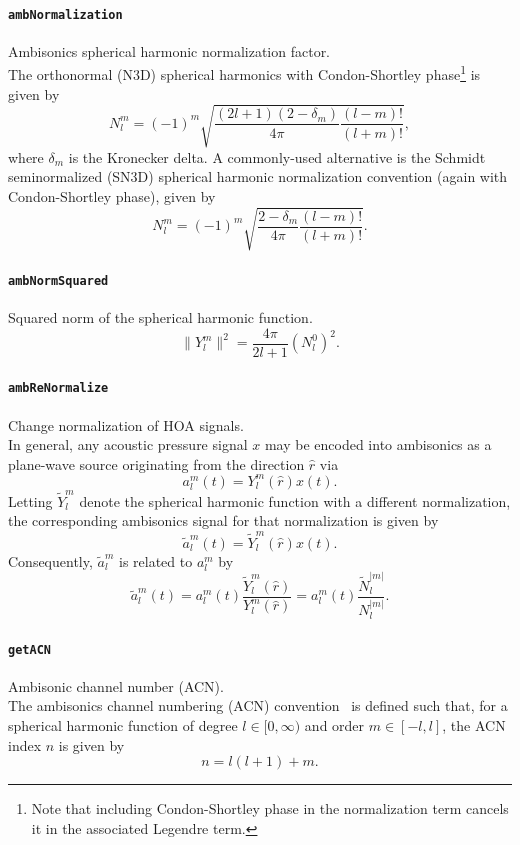\documentclass[11pt, oneside]{article}
\newcommand{\function}[1]{\paragraph*{\texttt{#1}}}
\begin{document}
\function{ambNormalization} Ambisonics spherical harmonic normalization factor. \\
The orthonormal (N3D) spherical harmonics with Condon-Shortley phase\footnote{Note that including Condon-Shortley phase in the normalization term cancels it in the associated Legendre term.} is given by
\begin{equation}\label{eq:ambNormalization_N3D}
N_l^m = (-1)^m \sqrt{\frac{(2l+1)(2 - \delta_m)}{4 \pi} \frac{(l-m)!}{(l+m)!}},
\end{equation}
where $\delta_m$ is the Kronecker delta.
A commonly-used alternative is the Schmidt seminormalized (SN3D) spherical harmonic normalization convention (again with Condon-Shortley phase), given by~\citep{Nachbar2011}
\begin{equation}\label{eq:ambNormalization_SN3D}
N_l^m = (-1)^m \sqrt{\frac{2 - \delta_m}{4 \pi} \frac{(l-m)!}{(l+m)!}}.
\end{equation}

\function{ambNormSquared} Squared norm of the spherical harmonic function. \\
\begin{equation}\label{eq:ambNormSquared}
\| Y_l^m \|^2 = \frac{4\pi}{2l + 1} \left( N_l^0 \right)^2.
\end{equation}

\function{ambReNormalize} Change normalization of HOA signals. \\
In general, any acoustic pressure signal $x$ may be encoded into ambisonics as a plane-wave source originating from the direction $\hat{r}$ via
\begin{equation}
a_l^m(t) = Y_l^m(\hat{r}) x(t).
\end{equation}
Letting $\tilde{Y}_l^m$ denote the spherical harmonic function with a different normalization, the corresponding ambisonics signal for that normalization is given by
\begin{equation}
\tilde{a}_l^m(t) = \tilde{Y}_l^m(\hat{r}) x(t).
\end{equation}
Consequently, $\tilde{a}_l^m$ is related to $a_l^m$ by
\begin{equation}
\tilde{a}_l^m(t) = a_l^m(t) \frac{\tilde{Y}_l^m(\hat{r})}{Y_l^m(\hat{r})} = a_l^m(t) \frac{\tilde{N}_l^{|m|}}{N_l^{|m|}}.
\end{equation}

\function{getACN} Ambisonic channel number (ACN). \\
The ambisonics channel numbering (ACN) convention~\citep{Nachbar2011} is defined such that, for a spherical harmonic function of degree $l \in [0,\infty)$ and order $m \in [-l,l]$, the ACN index $n$ is given by
\begin{equation}\label{eq:getACN}
n = l (l + 1) + m.
\end{equation}
\end{document}
